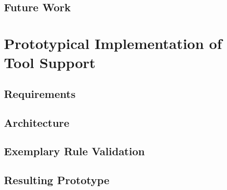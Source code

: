 \section{Future Work}
\label{e:future}



\chapter{Prototypical Implementation of Tool Support}
\label{Prototype}
\section{Requirements}
\section{Architecture}

\section{Exemplary Rule Validation}

\section{Resulting Prototype}


